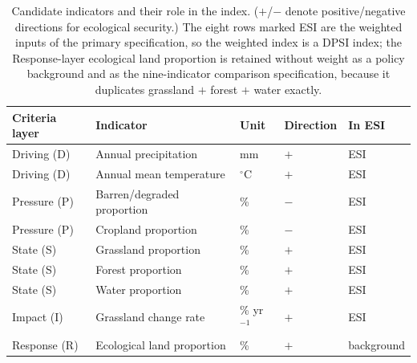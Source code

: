 \documentclass[preprint,11pt,authoryear]{elsarticle}
\begin{document}
\begin{table}[htbp]
\centering
\caption{Candidate indicators and their role in the index. ($+$/$-$ denote positive/negative directions for ecological security.) The eight rows marked ESI are the weighted inputs of the primary specification, so the weighted index is a DPSI index; the Response-layer ecological land proportion is retained without weight as a policy background and as the nine-indicator comparison specification, because it duplicates grassland $+$ forest $+$ water exactly.}
\label{tab:indicators}
\small
\begin{tabular}{lllll}
\toprule
Criteria layer & Indicator & Unit & Direction & In ESI \\
\midrule
Driving (D) & Annual precipitation & mm & $+$ & ESI \\
Driving (D) & Annual mean temperature & $^{\circ}$C & $+$ & ESI \\
Pressure (P) & Barren/degraded proportion & \% & $-$ & ESI \\
Pressure (P) & Cropland proportion & \% & $-$ & ESI \\
State (S) & Grassland proportion & \% & $+$ & ESI \\
State (S) & Forest proportion & \% & $+$ & ESI \\
State (S) & Water proportion & \% & $+$ & ESI \\
Impact (I) & Grassland change rate & \% yr$^{-1}$ & $+$ & ESI \\
Response (R) & Ecological land proportion & \% & $+$ & background \\
\bottomrule
\end{tabular}
\end{table}
\end{document}
